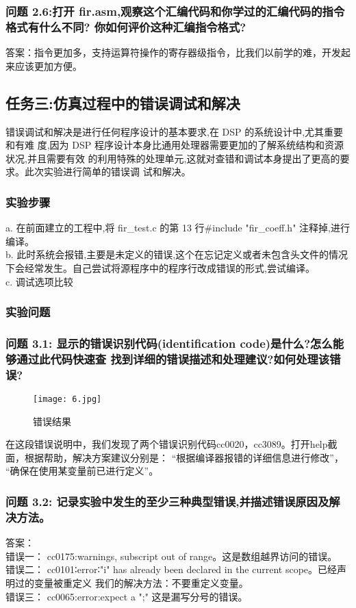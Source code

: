 \documentclass{article}
\begin{document}
\begin{CJK}{UTF8}{gbsn}
\subsubsection*{问题 2.6:打开 fir.asm,观察这个汇编代码和你学过的汇编代码的指令格式有什么不同?
你如何评价这种汇编指令格式?}
答案：指令更加多，支持运算符操作的寄存器级指令，比我们以前学的难，开发起来应该更加方便。
\subsection{任务三:仿真过程中的错误调试和解决}
错误调试和解决是进行任何程序设计的基本要求,在 DSP 的系统设计中,尤其重要和有难
度,因为 DSP 程序设计本身比通用处理器需要更加的了解系统结构和资源状况,并且需要有效
的利用特殊的处理单元,这就对查错和调试本身提出了更高的要求。此次实验进行简单的错误调
试和解决。
\subsubsection{实验步骤}
a. 在前面建立的工程中,将 fir\_test.c 的第 13 行\#include "fir\_coeff.h" 注释掉,进行编译。\\ 
b. 此时系统会报错,主要是未定义的错误,这个在忘记定义或者未包含头文件的情况下会经常发生。自己尝试将源程序中的程序行改成错误的形式,尝试编译。\\
c. 调试选项比较
\subsubsection{实验问题}
\subsubsection*{问题 3.1: 显示的错误识别代码(identification code)是什么?怎么能够通过此代码快速查
找到详细的错误描述和处理建议?如何处理该错误?}
\begin{figure}[h!]
\centering
\texttt{[image: 6.jpg]}
\caption{错误结果}
\end{figure}
在这段错误说明中，我们发现了两个错误识别代码cc0020，cc3089。打开help截面，根据帮助，解决方案建议分别是：
“根据编译器报错的详细信息进行修改”， “确保在使用某变量前已进行定义”。
\subsubsection*{问题 3.2: 记录实验中发生的至少三种典型错误,并描述错误原因及解决方法。}
答案：\\
错误一：
cc0175:warnings, subscript out of range。这是数组越界访问的错误。\\
错误二：
cc0101∶error∶"i" has already been declared in the current scope。已经声明过的变量被重定义
我们的解决方法：不要重定义变量。\\
错误三：
cc0065:error:expect a ";"
这是漏写分号的错误。

\end{CJK}
\end{document}
